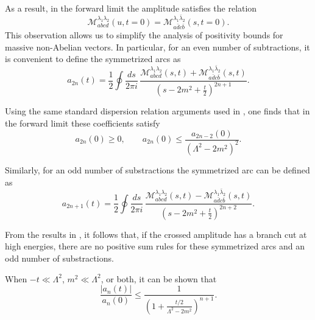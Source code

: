As a result, in the forward limit the amplitude satisfies the relation
\begin{equation}
    \mathcal{M}^{\lambda_1 \lambda_2}_{abcd} (u, t=0)
    = \mathcal{M}^{\lambda_1 \bar{\lambda}_2}_{a \bar{d} c \bar{b}} (s, t=0).
\end{equation}
This observation allows us to simplify the analysis of positivity bounds for massive non-Abelian vectors. In particular, for an even number of subtractions, it is convenient to define the symmetrized arcs as
\begin{equation}
    a_{2n}(t) = \frac{1}{2} \oint \frac{ds}{2 \pi i} \,
    \frac{
        \mathcal{M}^{\lambda_1 \lambda_2}_{abcd}(s,t)
        + \mathcal{M}^{\lambda_1 \bar{\lambda}_2}_{a \bar{d} c \bar{b}}(s,t)
    }{\left(s - 2m^2 + \tfrac{t}{2}\right)^{2n+1}}.
\end{equation}


Using the same standard dispersion relation arguments used in , one finds that in the forward limit these coefficients satisfy
\begin{equation}
    a_{2n}(0) \geq 0, 
    \qquad 
    a_{2n}(0) \leq \frac{a_{2n-2}(0)}{\left(\Lambda^2 - 2m^2\right)^2}.
\end{equation}

Similarly, for an odd number of substractions the symmetrized arc can be defined as 
\begin{equation}
    a_{2n + 1}(t) = \frac{1}{2} \oint \frac{ds}{2 \pi i} \,
    \frac{
        \mathcal{M}^{\lambda_1 \lambda_2}_{abcd}(s,t)
        - \mathcal{M}^{\lambda_1 \bar{\lambda}_2}_{a \bar{d} c \bar{b}}(s,t)
    }{\left(s - 2m^2 + \tfrac{t}{2}\right)^{2n + 2}}.
\end{equation}

From the results in , it follows that, if the crossed amplitude has a branch cut at high energies,  there are no positive sum rules for these symmetrized arcs and an odd number of substractions.

When $-t \ll \Lambda^2$, $m^2 \ll \Lambda^2$, or both, it can be shown \autocite{Bellazzini:2025shd} \autocite{Bellazzini:2023nqj} that  
\begin{equation}
    \frac{|a_n(t)|}{a_n(0)}
    \leq
    \frac{1}{\left(1+\frac{t/2}{\Lambda^2-2m^2}\right)^{n+1}}.
    \label{eq:trumpets}
\end{equation}

